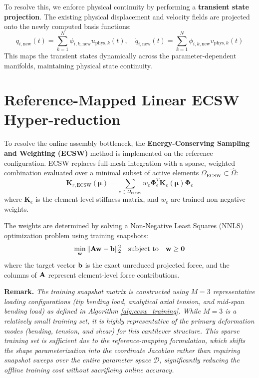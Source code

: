 To resolve this, we enforce physical continuity by performing a \textbf{transient state projection}. The existing physical displacement and velocity fields are projected onto the newly computed basis functions:
\begin{equation}
    q_{i, \text{new}}(t) = \sum_{k=1}^N \phi_{i, k, \text{new}} u_{\text{phys}, k}(t), \quad \dot{q}_{i, \text{new}}(t) = \sum_{k=1}^N \phi_{i, k, \text{new}} v_{\text{phys}, k}(t)
\end{equation}
This maps the transient states dynamically across the parameter-dependent manifolds, maintaining physical state continuity.

\section{Reference-Mapped Linear ECSW Hyper-reduction} \label{sec:ecsw}
To resolve the online assembly bottleneck, the \textbf{Energy-Conserving Sampling and Weighting (ECSW)} method \cite{Farhat2014} is implemented on the reference configuration. ECSW replaces full-mesh integration with a sparse, weighted combination evaluated over a minimal subset of active elements $\Omega_{\text{ECSW}} \subset \hat{\Omega}$:
\begin{equation}
    \mathbf{K}_{r, \text{ECSW}}(\boldsymbol{\mu}) = \sum_{e \in \Omega_{\text{ECSW}}} w_e \boldsymbol{\Phi}_e^T \mathbf{K}_{e}(\boldsymbol{\mu}) \boldsymbol{\Phi}_e
\end{equation}
where $\mathbf{K}_{e}$ is the element-level stiffness matrix, and $w_e$ are trained non-negative weights.

The weights are determined by solving a Non-Negative Least Squares (NNLS) optimization problem using training snapshots:
\begin{equation}
    \min_{\mathbf{w}} \|\mathbf{A}\mathbf{w} - \mathbf{b}\|_2^2 \quad \text{subject to} \quad \mathbf{w} \ge \mathbf{0}
\end{equation}
where the target vector $\mathbf{b}$ is the exact unreduced projected force, and the columns of $\mathbf{A}$ represent element-level force contributions.

\noindent\textbf{Remark.} \textit{The training snapshot matrix is constructed using $M = 3$ representative loading configurations (tip bending load, analytical axial tension, and mid-span bending load) as defined in Algorithm \ref{alg:ecsw_training}. While $M = 3$ is a relatively small training set, it is highly representative of the primary deformation modes (bending, tension, and shear) for this cantilever structure. This sparse training set is sufficient due to the reference-mapping formulation, which shifts the shape parameterization into the coordinate Jacobian rather than requiring snapshot sweeps over the entire parameter space $\mathcal{D}$, significantly reducing the offline training cost without sacrificing online accuracy.}

